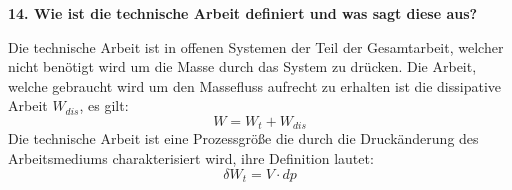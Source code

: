 \noindent \textbf{14. Wie ist die technische Arbeit definiert und was sagt diese aus?}\\
\begin{addmargin}[25pt]{0pt}
Die technische Arbeit ist in offenen Systemen der Teil der Gesamtarbeit, welcher nicht benötigt wird um die Masse durch das System zu drücken. Die Arbeit, welche gebraucht wird um den Massefluss aufrecht zu erhalten ist die dissipative Arbeit $W_{dis}$, es gilt:
\begin{equation}\label{eq:technische_Arbeit_dissipativ}
    W = W_t + W_{dis}
\end{equation}
Die technische Arbeit ist eine Prozessgröße die durch die Druckänderung des Arbeitsmediums charakterisiert wird, ihre Definition lautet:
\begin{equation}\label{eq:technische_Arbeit_Definition}
    \delta W_t = V\cdot \si{d}p
\end{equation}
\\
\end{addmargin}

